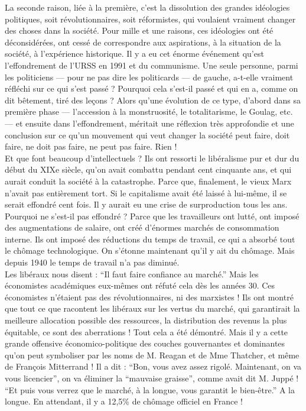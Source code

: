 La seconde raison, liée à la première, c’est la dissolution des grandes idéologies politiques, soit révolutionnaires, soit réformistes, qui voulaient vraiment changer des choses dans la société. Pour mille et une raisons, ces idéologies ont été déconsidérées, ont cessé de correspondre aux aspirations, à la situation de la société, à l’expérience historique. Il y a eu cet énorme événement qu’est l’effondrement de l’URSS en 1991 et du communisme. Une seule personne, parmi les politiciens --- pour ne pas dire les politicards --- de gauche, a-t-elle vraiment réfléchi sur ce qui s’est passé ? Pourquoi cela s’est-il passé et qui en a, comme on dit bêtement, tiré des leçons ? Alors qu’une évolution de ce type, d’abord dans sa première phase --- l’accession à la monstruosité, le totalitarisme, le Goulag, etc. --- et ensuite dans l’effondrement, méritait une réflexion très approfondie et une conclusion sur ce qu’un mouvement qui veut changer la société peut faire, doit faire, ne doit pas faire, ne peut pas faire. Rien !\\
Et que font beaucoup d’intellectuels ? Ils ont ressorti le libéralisme pur et dur du début du XIXe siècle, qu’on avait combattu pendant cent cinquante ans, et qui aurait conduit la société à la catastrophe. Parce que, finalement, le vieux Marx n’avait pas entièrement tort. Si le capitalisme avait été laissé à lui-même, il se serait effondré cent fois. Il y aurait eu une crise de surproduction tous les ans. Pourquoi ne s’est-il pas effondré ? Parce que les travailleurs ont lutté, ont imposé des augmentations de salaire, ont créé d’énormes marchés de consommation interne. Ils ont imposé des réductions du temps de travail, ce qui a absorbé tout le chômage technologique. On s’étonne maintenant qu’il y ait du chômage. Mais depuis 1940 le temps de travail n’a pas diminué.\\
Les libéraux nous disent : ``Il faut faire confiance au marché.'' Mais les économistes académiques eux-mêmes ont réfuté cela dès les années 30. Ces économistes n’étaient pas des révolutionnaires, ni des marxistes ! Ils ont montré que tout ce que racontent les libéraux sur les vertus du marché, qui garantirait la meilleure allocation possible des ressources, la distribution des revenus la plus équitable, ce sont des aberrations ! Tout cela a été démontré. Mais il y a cette grande offensive économico-politique des couches gouvernantes et dominantes qu’on peut symboliser par les noms de M. Reagan et de Mme Thatcher, et même de François Mitterrand ! Il a dit : ``Bon, vous avez assez rigolé. Maintenant, on va vous licencier'', on va éliminer la ``mauvaise graisse'', comme avait dit M. Juppé ! ``Et puis vous verrez que le marché, à la longue, vous garantit le bien-être.'' A la longue. En attendant, il y a 12,5\% de chômage officiel en France !

